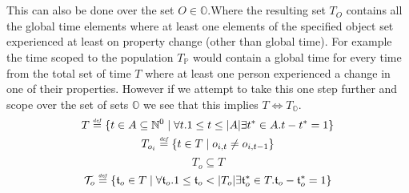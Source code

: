 \documentclass[]{article}
\newcommand{\defeq}{\stackrel{\smash{\scriptscriptstyle\mathit{def}}}{=}}
\begin{document}
\\
\\
This can also be done over the set $O \in \mathbb{O}$.Where the resulting set $T_{O}$ contains all the global time elements where at least one elements of the specified object set experienced at least on property change (other than global time). For example the time scoped to the population $T_{\mathbb{P}}$ would contain a global time for every time from the total set of time $T$ where at least one person experienced a change in one of their properties. However if we attempt to take this one step further and scope over the set of sets $\mathbb{O}$ we see that this implies $T \Longleftrightarrow T_{\mathbb{O}}$. 
\begin{equation} \label{eq:global_time} 
T \defeq \{ t \in A \subseteq \mathbb{N}^{0} \mid \forall t.1 \leq t \leq |A|\exists t^{*} \in A.t-t^{*}=1 \} 
\end{equation}
\begin{equation} \label{eq:object_element_time}
T_{o_{i}} \defeq \{ t \in T \mid o_{i, t} \ne o_{i, t-1} \}
\end{equation}
\begin{equation} \label{eq:subset_global_time}
T_{o} \subseteq T
\end{equation}
\begin{equation} \label{eq:relative_object_time} 
\mathcal{T}_{o} \defeq \{ \mathfrak{t}_{o} \in T \mid \forall \mathfrak{t}_{o}.1 \leq \mathfrak{t}_{o}  < |T_{o}| \exists \mathfrak{t}^{*}_{o} \in T.\mathfrak{t}_{o}-\mathfrak{t}^{*}_{o}=1 \} 
\end{equation}
\end{document}

